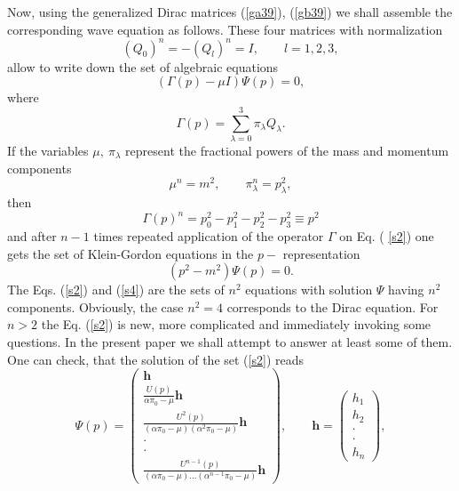 \documentclass[a4paper,a4paper]{article}
\begin{document}
Now, using the generalized Dirac matrices (\ref{ga39}), (\ref{gb39}) we
shall assemble the corresponding wave equation as follows. These four
matrices with normalization 
\begin{equation}
\left( Q_{0}\right) ^{n}=-\left( Q_{l}\right) ^{n}=I,\qquad l=1,2,3,
\label{s1}
\end{equation}%
allow to write down the set of algebraic equations 
\begin{equation}
\left( \Gamma (p)-\mu I\right) \Psi (p)=0,  \label{s2}
\end{equation}%
where%
\begin{equation}
\Gamma (p)=\sum_{\lambda =0}^{3}\pi _{\lambda }Q_{\lambda }.  \label{s3}
\end{equation}%
If the variables $\mu ,\ \pi _{\lambda }$ represent the fractional powers of
the mass and momentum components%
\begin{equation}
\mu ^{n}=m^{2},\qquad \pi _{\lambda }^{n}=p_{\lambda }^{2},  \label{sa3}
\end{equation}%
then 
\begin{equation}
\Gamma (p)^{n}=p_{0}^{2}-p_{1}^{2}-p_{2}^{2}-p_{3}^{2}\equiv p^{2}
\label{sb3}
\end{equation}%
and after $n-1$ times repeated application of the operator $\Gamma $ on Eq. (%
\ref{s2}) one gets the set of Klein-Gordon equations in the $p-$%
representation 
\begin{equation}
\left( p^{2}-m^{2}\right) \Psi (p)=0.  \label{s4}
\end{equation}%
The Eqs. (\ref{s2}) and (\ref{s4}) are the sets of $n^{2}$ equations with
solution $\Psi $ having $n^{2}$ components. Obviously, the case $n^{2}=4$
corresponds to the Dirac equation. For $n>2$ the Eq. (\ref{s2}) is new, more
complicated and immediately invoking some questions. In the present paper we
shall attempt to answer at least some of them. One can check, that the
solution of the set (\ref{s2}) reads%
\begin{equation}
\Psi (p)=\left( 
\begin{array}{c}
\mathbf{h} \\ 
\frac{U(p)}{\alpha \pi _{0}-\mu }\mathbf{h} \\ 
\frac{U^{2}(p)}{(\alpha \pi _{0}-\mu )(\alpha ^{2}\pi _{0}-\mu )}\mathbf{h}
\\ 
\cdot  \\ 
\cdot  \\ 
\frac{U^{n-1}(p)}{(\alpha \pi _{0}-\mu )...(\alpha ^{n-1}\pi _{0}-\mu )}%
\mathbf{h}%
\end{array}%
\right) ,\qquad \mathbf{h}=\left( 
\begin{array}{c}
h_{1} \\ 
h_{2} \\ 
\cdot  \\ 
\cdot  \\ 
h_{n}%
\end{array}%
\right) ,  \label{sa4}
\end{equation}%
\end{document}
